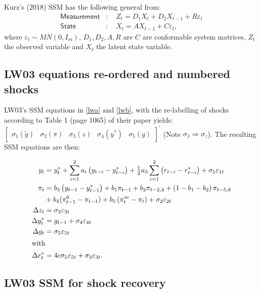 \documentclass[a4paper,12pt]{article}
\newcommand{\bsq}{\begin{subequations}}\newcommand{\esq}{\end{subequations}}
\newcommand{\intxt}[1]{\intertext{#1}}\newcommand{\BAW}[1]{\begin{adjustwidth}{-#1mm}{-5mm}}\newcommand{\EAW}{\end{adjustwidth}}
\begin{document}
Kurz's (2018) SSM has the following general from:\bsq\label{SSM}%
\begin{align}
\mathsf{Measurement}& :\quad Z_{t}=D_{1}X_{t}+D_{2}X_{t-1}+R\varepsilon _{t}
\label{ssm1} \\
\mathsf{State}& :\quad X_{t}=AX_{t-1}+C\varepsilon _{t},  \label{ssm2}
\end{align}%
\esq where $\varepsilon _{t}\sim MN(0,I_{m})$, $D_{1},D_{2},A,R$ are $C$ are
conformable system matrices, $Z_{t}$ the observed variable and $X_{t}$ the
latent state variable.

\subsection{LW03 equations re-ordered and numbered shocks}

LW03's SSM equations in \ref{lwa} and \ref{lwb}, with the re-labelling of
shocks according to Table 1 (page 1065) of their paper yields:\ $%
\begin{bmatrix}
\sigma _{1}(\tilde{y}) & \sigma _{2}(\pi ) & \sigma _{3}(z) & \sigma
_{4}(y^{\ast }) & \sigma _{5}(g)%
\end{bmatrix}%
^{\prime }$ (Note $\sigma _{3}\Rightarrow \sigma _{z}$). The resulting SSM
equations are then:

\pagebreak \bsq\label{LW03}%
\begin{align}
y_{t}& =y_{t}^{\ast }+\sum_{i=1}^{2}a_{i}\left( y_{t-i}-y_{t-i}^{\ast
}\right) +\tfrac{1}{2}a_{3}\sum_{i=1}^{2}\left( r_{t-i}-r_{t-i}^{\ast
}\right) +\sigma _{1}\varepsilon _{1t}  \label{LW03a} \\
\pi _{t}& =b_{3}\left( y_{t-1}-y_{t-1}^{\ast }\right) +b_{1}\pi
_{t-1}+b_{2}\pi _{t-2,4}+\left( 1-b_{1}-b_{2}\right) \pi _{t-5,8}  \notag \\
& +b_{4}(\pi _{t-1}^{0}-\pi _{t-1})+b_{5}\left( \pi _{t}^{m}-\pi _{t}\right)
+\sigma _{2}\varepsilon _{2t} \\
\Delta z_{t}& =\sigma _{3}\varepsilon _{3t}  \label{LW03c} \\
\Delta y_{t}^{\ast }& =g_{t-1}+\sigma _{4}\varepsilon _{4t}  \label{LW03d} \\
\Delta g_{t}& =\sigma _{5}\varepsilon _{5t}  \label{LW03e} \\
\intxt{with}\Delta r_{t}^{\ast }& =4c\sigma _{5}\varepsilon _{5t}+\sigma
_{3}\varepsilon _{3t}.  \label{LW03f}
\end{align}%
\esq

\subsection{LW03 SSM for shock recovery}
\end{document}

